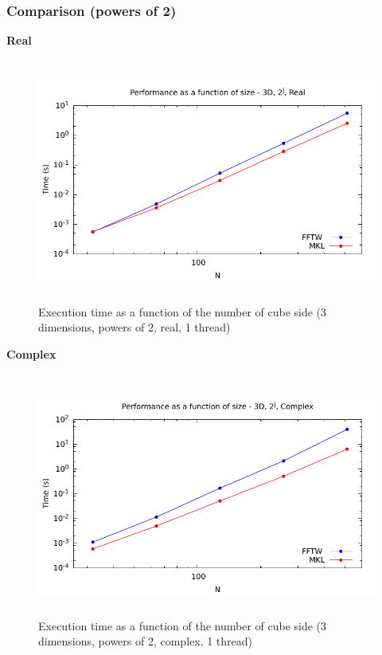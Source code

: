 \documentclass[12pt, a4paper]{article}
\begin{document}
\subsubsection{Comparison (powers of 2)}
{\bf Real}
\begin{figure}[H]
\captionsetup{width=0.6\textwidth}
\centering
\includegraphics[height=8cm]{graphs/performance/3d-pow2-r.pdf}
\caption{Execution time as a function of the number of cube side (3 dimensions, powers of 2, real, 1 thread)}
\label{3DPOW2R}
\end{figure}
{\bf Complex}
\begin{figure}[H]
\captionsetup{width=0.6\textwidth}
\centering
\includegraphics[height=8cm]{graphs/performance/3d-pow2-c.pdf}
\caption{Execution time as a function of the number of cube side (3 dimensions, powers of 2, complex, 1 thread)}
\label{3DPOW2C}
\end{figure}   
\end{document}
